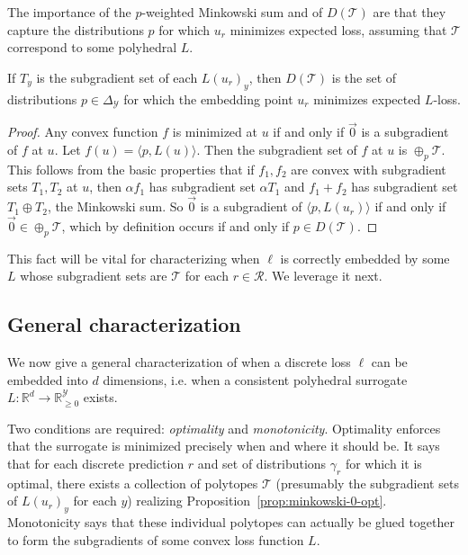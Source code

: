 \documentclass[anon]{colt2020} %
\newcommand{\reals}{\mathbb{R}}
\newcommand{\simplex}{\Delta_\Y}
\newcommand{\R}{\mathcal{R}}
\newcommand{\T}{\mathcal{T}}
\newcommand{\Y}{\mathcal{Y}}
\newcommand{\Opt}{\mathrm{Opt}}
\newcommand{\inprod}[2]{\langle #1, #2 \rangle}%
\begin{document}
The importance of the $p$-weighted Minkowski sum and of $D(\T)$ are that they capture the distributions $p$ for which $u_r$ minimizes expected loss, assuming that $\T$ correspond to some polyhedral $L$.
\begin{proposition} \label{prop:minkowski-0-opt}
  If $T_y$ is the subgradient set of each $L(u_r)_y$, then $D(\T)$ is the set of distributions $p \in \simplex$ for which the embedding point $u_r$ minimizes expected $L$-loss.
\end{proposition}
\begin{proof}
  Any convex function $f$ is minimized at $u$ if and only if $\vec 0$ is a subgradient of $f$ at $u$.
  Let $f(u) = \inprod{p}{L(u)}$.
  Then the subgradient set of $f$ at $u$ is $\oplus_p \T$.
  This follows from the basic properties that if $f_1,f_2$ are convex with subgradient sets $T_1,T_2$ at $u$, then $\alpha f_1$ has subgradient set $\alpha T_1$ and $f_1 + f_2$ has subgradient set $T_1 \oplus T_2$, the Minkowski sum.
  So $\vec 0$ is a subgradient of $\inprod{p}{L(u_r)}$ if and only if $\vec 0 \in \oplus_p \T$, which by definition occurs if and only if $p \in D(\T)$.
\end{proof}
This fact will be vital for characterizing when $\ell$ is correctly embedded by some $L$ whose subgradient sets are $\T$ for each $r \in \R$.
We leverage it next.

\subsection{General characterization}

We now give a general characterization of when a discrete loss $\ell$ can be embedded into $d$ dimensions, i.e. when a consistent polyhedral surrogate $L: \reals^d \to \reals^{\Y}_{\geq 0}$ exists.

Two conditions are required: \emph{optimality} and \emph{monotonicity}.
Optimality enforces that the surrogate is minimized precisely when and where it should be.
It says that for each discrete prediction $r$ and set of distributions $\gamma_r$ for which it is optimal, there exists a collection of polytopes $\T$ (presumably the subgradient sets of $L(u_r)_y$ for each $y$) realizing Proposition~\ref{prop:minkowski-0-opt}.
Monotonicity says that these individual polytopes can actually be glued together to form the subgradients of some convex loss function $L$.

\end{document}
